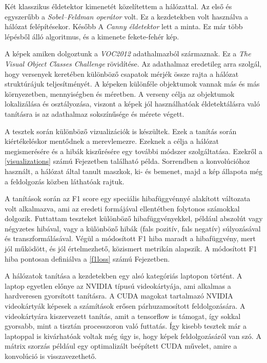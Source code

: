 \documentclass[12pt]{report}
\begin{document}
Két klasszikus éldetektor kimenetét közelítettem a hálózattal. Az első és egyszerűbb a \textit{Sobel–Feldman operátor} \cite{sobel} volt. Ez a kezdetekben volt használva a hálózat felépítésekor. Később A \textit{Canny éldetektor} \cite{canny} lett a minta. Ez már több lépésből álló algoritmus, és a kimenete fekete-fehér kép.

A képek amiken dolgoztunk a \textit{VOC2012} \cite{pascal-voc-2012} adathalmazból származnak. Ez a \textit{The Visual Object Classes Challenge} rövidítése. Az adathalmaz eredetileg arra szolgál, hogy versenyek keretében különböző csapatok mérjék össze rajta a hálózat struktúrájuk teljesítményét. A képeken különféle objektumok vannak más és más környezetben, mennyiségben és méretben. A verseny célja az objektumok lokalizálása és osztályozása, viszont a képek jól használhatóak éldetektálásra való tanításra is az adathalmaz sokszínűsége és mérete végett.

A tesztek során különböző vizualizációk is készültek. Ezek a tanítás során kiértékeléskor mentődnek a merevlemezre. Ezeknek a célja a hálózat megismerésére és a hibák kiszűrésére egy további módszer szolgáltatása. Ezekről a \ref{visualizations} számú Fejezetben található példa. Sorrendben a konvolúcióhoz használt, a hálózat által tanult maszkok, ki- és bemenet, majd a kép állapota még a feldolgozás közben láthatóak rajtuk.

A tanítások során az F1 score egy speciális hibafüggvénnyé alakított változata volt alkalmazva, ami az eredeti formájával ellentétben folytonos számokkal dolgozik. Futtattam teszteket különböző hibafüggvényekkel, például abszolút vagy négyzetes hibával, vagy a különböző hibák (fals pozitív, fals negatív) súlyozásával és transzformálásával. Végül a módosított F1 hiba maradt a hibafüggvény, mert jól működött, és jól értelmezhető, közismert metrikán alapszik. A módosított F1 hiba pontosan definiálva a \ref{f1loss} számú Fejezetben.

A hálózatok tanítása a kezdetekben egy alsó kategóriás laptopon történt. A laptop egyetlen előnye az NVIDIA típusú videokártyája, ami alkalmas a hardveresen gyorsított tanításra. A CUDA magokat tartalmazó NVIDIA videokártyák képesek a számítások erősen párhuzamosított feldolgozására. A videokártyára kiszervezett tanítás, amit a tensorflow is támogat, így sokkal gyorsabb, mint a tisztán processzoron való futtatás. Így kisebb tesztek már a laptoppal is kivárhatóak voltak még úgy is, hogy képek feldolgozásáról van szó. A mátrix szorzás például egy optimalizált beépített CUDA művelet, amire a konvolúció is visszavezethető.
\end{document}

